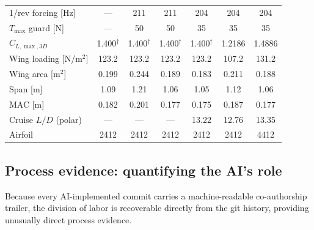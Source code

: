 \begin{table}[htbp]
\begin{tabular}{@{}lcccccc@{}}
1/rev forcing [Hz]                 & ---  & 211  & 211   & 204   & 204   & 204 \\
$T_{\max}$ guard [N]               & ---  & 50   & 50    & 35    & 35    & 35 \\
\addlinespace
$C_{L,\max,3D}$                    & 1.400$^{\dagger}$ & 1.400$^{\dagger}$
                                   & 1.400$^{\dagger}$ & 1.400$^{\dagger}$
                                   & 1.2186 & 1.4886 \\
Wing loading [N/m$^2$]             & 123.2 & 123.2 & 123.2 & 123.2 & 107.2 & 131.2 \\
Wing area [m$^2$]                  & 0.199 & 0.244 & 0.189 & 0.183 & 0.211 & 0.188 \\
Span [m]                           & 1.09  & 1.21  & 1.06  & 1.05  & 1.12  & 1.06 \\
MAC [m]                            & 0.182 & 0.201 & 0.177 & 0.175 & 0.187 & 0.177 \\
Cruise $L/D$ (polar)               & ---   & ---   & ---   & 13.22 & 12.76 & 13.35 \\
\addlinespace
Airfoil                            & 2412 & 2412 & 2412 & 2412 & 2412 & 4412 \\
\bottomrule
\end{tabular}
\end{table}

\subsection{Process evidence: quantifying the AI's role}
\label{sec:process-results}

Because every AI-implemented commit carries a machine-readable
co-authorship trailer, the division of labor is recoverable directly
from the git history, providing unusually direct process evidence.

